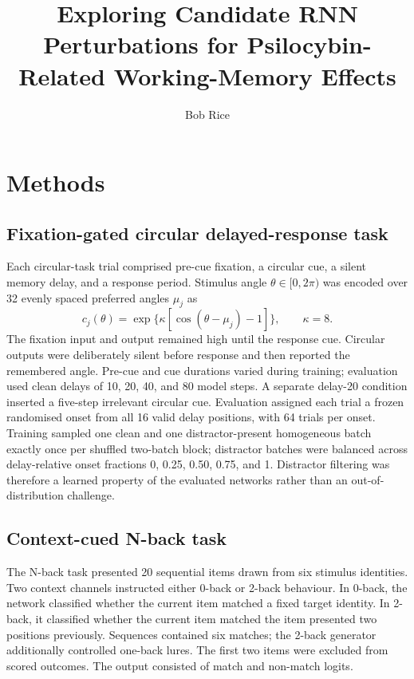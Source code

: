 \documentclass[11pt,reprint,aps,prl,floatfix,secnumarabic]{revtex4-2}
\begin{document}
\title{Exploring Candidate RNN Perturbations for
Psilocybin-Related Working-Memory Effects}

\author{Bob Rice}

\maketitle

\section{Methods}

\subsection{Fixation-gated circular delayed-response task}

Each circular-task trial comprised pre-cue fixation, a circular cue, a silent
memory delay, and a response period. Stimulus angle
$\theta\in[0,2\pi)$ was encoded over 32 evenly spaced preferred angles
$\mu_j$ as
\begin{equation}
 c_j(\theta)=\exp\{\kappa[\cos(\theta-\mu_j)-1]\},\qquad \kappa=8.
\end{equation}
The fixation input and output remained high until the response cue. Circular
outputs were deliberately silent before response and then reported the
remembered angle. Pre-cue and cue durations varied during training; evaluation
used clean delays of 10, 20, 40, and 80 model steps. A separate delay-20
condition inserted a five-step irrelevant circular cue. Evaluation assigned
each trial a frozen randomised onset from all 16 valid delay positions, with 64
trials per onset. Training sampled one clean and one distractor-present
homogeneous batch exactly once per shuffled two-batch block; distractor batches
were balanced across delay-relative onset fractions 0, 0.25, 0.50, 0.75, and
1. Distractor filtering was therefore a learned property of the evaluated
networks rather than an out-of-distribution challenge.

\subsection{Context-cued N-back task}

The N-back task presented 20 sequential items drawn from six stimulus
identities. Two context channels instructed either
0-back or 2-back behaviour. In 0-back, the network classified whether the
current item matched a fixed target identity. In 2-back, it classified whether
the current item matched the item presented two positions previously.
Sequences contained six matches; the 2-back generator additionally controlled
one-back lures. The first two items were excluded from scored outcomes. The
output consisted of match and non-match logits.
\end{document}
